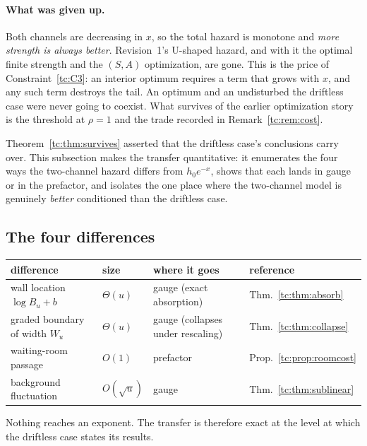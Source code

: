 \documentclass[11pt]{article}
\numberwithin{equation}{section}
\theoremstyle{plain}
\theoremstyle{definition}
\theoremstyle{remark}
\begin{document}
\paragraph{What was given up.}\label{tc:rem:givenup}
Both channels are decreasing in $x$, so the total hazard is monotone and
\emph{more strength is always better}. Revision~1's U-shaped hazard, and
with it the optimal finite strength and the $(S,A)$ optimization, are
gone. This is the price of Constraint~\ref{tc:C3}: an interior optimum
requires a term that grows with $x$, and any such term destroys the
tail. An optimum and an undisturbed the driftless case were never going to
coexist. What survives of the earlier optimization story is the
threshold at $\rho=1$ and the trade recorded in
Remark~\ref{tc:rem:cost}.

Theorem~\ref{tc:thm:survives} asserted that the driftless case's conclusions
carry over. This subsection makes the transfer quantitative: it
enumerates the four ways the two-channel hazard differs from
$h_{0}e^{-x}$, shows that each lands in gauge or in the prefactor, and
isolates the one place where the two-channel model is genuinely
\emph{better} conditioned than the driftless case.

\subsection{The four differences}\label{tc:subsub:four}

\begin{center}\small
\begin{tabular}{@{}llll@{}}
\toprule
difference & size & where it goes & reference\\
\midrule
wall location $\log B_u+b$ & $\Theta(u)$ & gauge (exact absorption) &
Thm.~\ref{tc:thm:absorb}\\
graded boundary of width $W_u$ & $\Theta(u)$ & gauge (collapses under
rescaling) & Thm.~\ref{tc:thm:collapse}\\
waiting-room passage & $O(1)$ & prefactor & Prop.~\ref{tc:prop:roomcost}\\
background fluctuation & $O(\sqrt u)$ & gauge &
Thm.~\ref{tc:thm:sublinear}\\
\bottomrule
\end{tabular}
\end{center}

\noindent Nothing reaches an exponent. The transfer is therefore exact
at the level at which the driftless case states its results.
\end{document}
